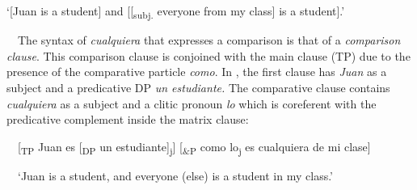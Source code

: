 \begin{listWWNumxleveli}
\item 
\begin{styleStandard}
‘[Juan is a student] and [[\textsubscript{subj.} everyone from my class] is a student].’
\end{styleStandard}
\end{listWWNumxleveli}
\begin{styleStandard}
\ \ The syntax of \textit{cualquiera} that expresses a comparison is that of a \textit{comparison clause}. This comparison clause is conjoined with the main clause (TP) due to the presence of the comparative particle \textit{como}. In , the first clause has \textit{Juan} as a subject and a predicative DP \textit{un estudiante.} The comparative clause contains \textit{cualquiera} as a subject and a clitic pronoun \textit{lo} which is coreferent with the predicative complement inside the matrix clause:
\end{styleStandard}

\begin{styleStandard}
\label{bkm:Ref72354100}\ \ [\textsubscript{TP} Juan es [\textsubscript{DP }un estudiante]\textsubscript{j}] [\textsubscript{\&P} como lo\textsubscript{j} es cualquiera de mi clase]
\end{styleStandard}

\begin{styleStandard}
\ \ ‘Juan is a student, and everyone (else) is a student in my class.’
\end{styleStandard}

